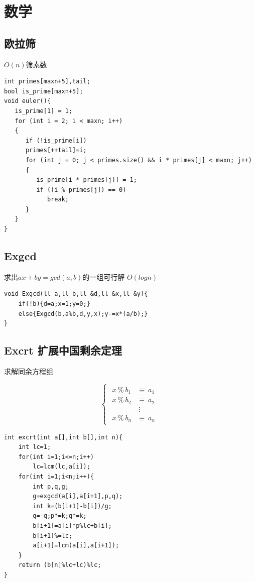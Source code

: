 \documentclass[a4]{ctexart}
\begin{document}
\section{数学}

\subsection{欧拉筛}
$O(n)$筛素数
\begin{lstlisting}
int primes[maxn+5],tail;
bool is_prime[maxn+5];
void euler(){
   is_prime[1] = 1;
   for (int i = 2; i < maxn; i++)
   {
      if (!is_prime[i])
      primes[++tail]=i;
      for (int j = 0; j < primes.size() && i * primes[j] < maxn; j++)
      {
         is_prime[i * primes[j]] = 1;
         if ((i % primes[j]) == 0)
            break;
      }
   }
}
\end{lstlisting}

\subsection{Exgcd}
求出$ax+by=gcd(a,b)$的一组可行解 $O(logn)$ 
\begin{lstlisting}
void Exgcd(ll a,ll b,ll &d,ll &x,ll &y){
	if(!b){d=a;x=1;y=0;}
	else{Exgcd(b,a%b,d,y,x);y-=x*(a/b);}
}
\end{lstlisting}

\subsection{Excrt 扩展中国剩余定理}
\begin{center}
	求解同余方程组
\end{center}

\[
\begin{cases}
	\begin{aligned}
	x \ \% \ b_1  &\equiv \  a_1\\
	x \ \% \ b_2  &\equiv \ a_2\\
	           		& \ \vdots   \\
	x \ \% \ b_n  &\equiv  \ a_n
	\end{aligned}
\end{cases}
\]

  
  
\begin{lstlisting}
int excrt(int a[],int b[],int n){
    int lc=1;
    for(int i=1;i<=n;i++)
        lc=lcm(lc,a[i]);
    for(int i=1;i<n;i++){
        int p,q,g;
        g=exgcd(a[i],a[i+1],p,q);
        int k=(b[i+1]-b[i])/g;
        q=-q;p*=k;q*=k;
        b[i+1]=a[i]*p%lc+b[i];
        b[i+1]%=lc;
        a[i+1]=lcm(a[i],a[i+1]);
    }
    return (b[n]%lc+lc)%lc;
}
\end{lstlisting}
\end{document}
